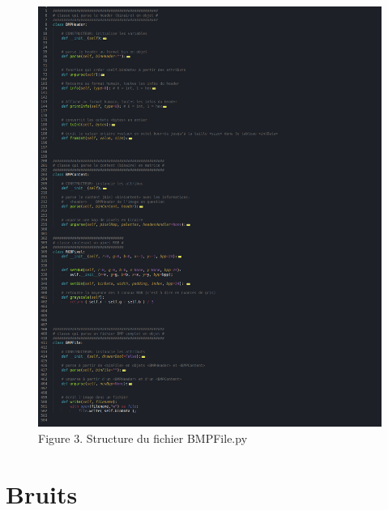 \documentclass{article}
\begin{document}
	
	\begin{figure}
		\begin{center}
			\includegraphics[scale=.4]{st3/BMPFile.jpg}
			Figure 3. Structure du fichier BMPFile.py
		\end{center}
	\end{figure}

		
	
	
	
	\newpage
	
	
	
	
	
	\part*{Bruits}
	
	
	
	
\end{document}

